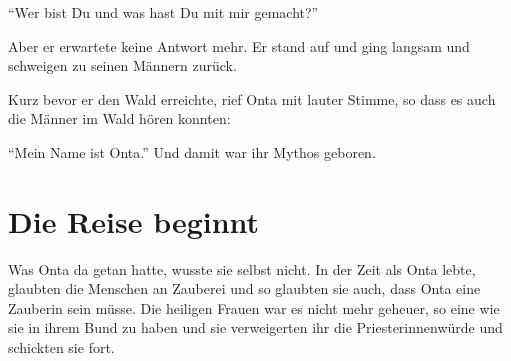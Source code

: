 \enquote{Wer bist Du und was hast Du mit mir gemacht?} 

Aber er erwartete keine Antwort mehr. Er stand auf und ging langsam und schweigen zu seinen Männern zurück.

Kurz bevor er den Wald erreichte, rief Onta mit lauter Stimme, so dass es auch die Männer im Wald hören konnten:

\enquote{Mein Name ist Onta.} Und damit war ihr Mythos geboren.

\section*{Die Reise beginnt}
Was Onta da getan hatte, wusste sie selbst nicht. In der Zeit als Onta lebte, glaubten die Menschen an Zauberei und so glaubten sie auch, dass Onta eine Zauberin sein müsse. Die heiligen Frauen war es nicht mehr geheuer, so eine wie sie in ihrem Bund zu haben und sie verweigerten ihr die Priesterinnenwürde und schickten sie fort.





  \hfill {\color{red}\decofourleft}
